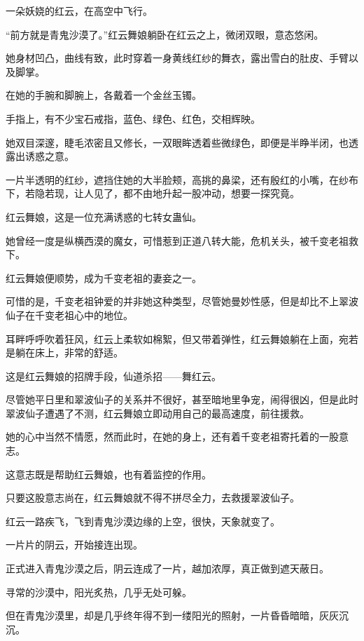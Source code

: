 
\begin{this_body}



一朵妖娆的红云，在高空中飞行。

“前方就是青鬼沙漠了。”红云舞娘躺卧在红云之上，微闭双眼，意态悠闲。

她身材凹凸，曲线有致，此时穿着一身黄线红纱的舞衣，露出雪白的肚皮、手臂以及脚掌。

在她的手腕和脚腕上，各戴着一个金丝玉镯。

手指上，有不少宝石戒指，蓝色、绿色、红色，交相辉映。

她双目深邃，睫毛浓密且又修长，一双眼眸透着些微绿色，即便是半睁半闭，也透露出诱惑之意。

一片半透明的红纱，遮挡住她的大半脸颊，高挑的鼻梁，还有殷红的小嘴，在纱布下，若隐若现，让人见了，都不由地升起一股冲动，想要一探究竟。

红云舞娘，这是一位充满诱惑的七转女蛊仙。

她曾经一度是纵横西漠的魔女，可惜惹到正道八转大能，危机关头，被千变老祖救下。

红云舞娘便顺势，成为千变老祖的妻妾之一。

可惜的是，千变老祖钟爱的并非她这种类型，尽管她曼妙性感，但是却比不上翠波仙子在千变老祖心中的地位。

耳畔呼呼吹着狂风，红云上柔软如棉絮，但又带着弹性，红云舞娘躺在上面，宛若是躺在床上，非常的舒适。

这是红云舞娘的招牌手段，仙道杀招——舞红云。

尽管她平日里和翠波仙子的关系并不很好，甚至暗地里争宠，闹得很凶，但是此时翠波仙子遭遇了不测，红云舞娘立即动用自己的最高速度，前往援救。

她的心中当然不情愿，然而此时，在她的身上，还有着千变老祖寄托着的一股意志。

这意志既是帮助红云舞娘，也有着监控的作用。

只要这股意志尚在，红云舞娘就不得不拼尽全力，去救援翠波仙子。

红云一路疾飞，飞到青鬼沙漠边缘的上空，很快，天象就变了。

一片片的阴云，开始接连出现。

正式进入青鬼沙漠之后，阴云连成了一片，越加浓厚，真正做到遮天蔽日。

寻常的沙漠中，阳光炙热，几乎无处可躲。

但在青鬼沙漠里，却是几乎终年得不到一缕阳光的照射，一片昏昏暗暗，灰灰沉沉。


\end{this_body}
